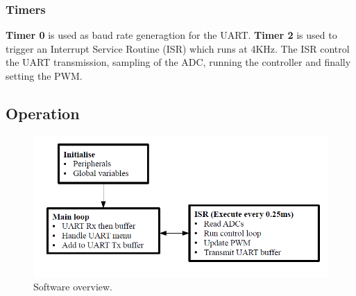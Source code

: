 \documentclass[12pt]{article}%
\begin{document}
\subsubsection{Timers}

\textbf{Timer 0} is used as baud rate generagtion for the UART. \textbf{Timer 2} is used to trigger an Interrupt Service Routine (ISR) which runs at 4KHz. The ISR control the UART transmission, sampling of the ADC, running the controller and finally setting the PWM.

\subsection{Operation}

\begin{figure}[H]
	\centering
  	\includegraphics[width=12cm]{code.png}
  	\caption{Software overview.}
  	\label{fig:overview}
\end{figure}
\end{document}
